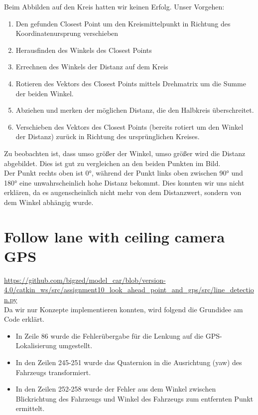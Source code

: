\documentclass[10pt,oneside,a4paper]{article}
\begin{document}
	Beim Abbilden auf den Kreis hatten wir keinen Erfolg. Unser Vorgehen:
	\begin{enumerate}
		\item Den gefunden Closest Point um den Kreismittelpunkt in Richtung des
		Koordinatenursprung verschieben
		\item Herausfinden des Winkels des Closest Points
		\item Errechnen des Winkels der Distanz auf dem Kreis
		\item Rotieren des Vektors des Closest Points mittels Drehmatrix um die Summe der
		beiden Winkel.
		\item Abziehen und merken der möglichen Distanz, die den Halbkreis überschreitet.
		\item Verschieben des Vektors des Closest Points (bereits rotiert um den Winkel der
		Distanz) zurück in Richtung des ursprünglichen Kreises.
	\end{enumerate}
	Zu beobachten ist, dass umso größer der Winkel, umso größer wird die Distanz
	abgebildet. Dies ist gut zu vergleichen an den beiden Punkten im Bild. \\
	Der Punkt rechts oben ist 0°, während der Punkt links oben zwischen 90° und 180° eine
	unwahrscheinlich hohe Distanz bekommt. Dies konnten wir uns nicht erklären, da es 
	augenscheinlich nicht mehr von dem Distanzwert, sondern von dem Winkel abhängig wurde.
	\newpage
  \section{Follow lane with ceiling camera GPS}
    \url{https://github.com/bigzed/model_car/blob/version-4.0/catkin_ws/src/assignment10_look_ahead_point_and_gps/src/line_detection.py}\\
	Da wir nur Konzepte implementieren konnten, wird folgend die Grundidee am Code erklärt.
	\begin{itemize}
		\item In Zeile 86 wurde die Fehlerübergabe für die Lenkung auf die GPS-Lokalisierung umgestellt.
		\item In den Zeilen 245-251 wurde das Quaternion in die Ausrichtung (yaw)
		des Fahrzeugs transformiert.
		\item In den Zeilen 252-258 wurde der Fehler aus dem Winkel zwischen Blickrichtung
		des Fahrzeugs und Winkel des Fahrzeugs zum entfernten Punkt ermittelt.
	\end{itemize}
\end{document}
